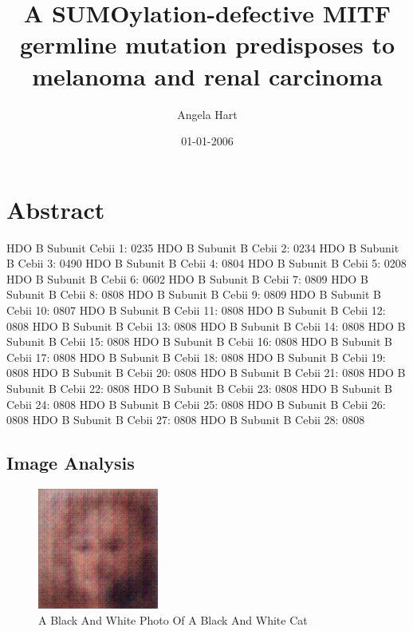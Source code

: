 \documentclass{article}%
\title{A SUMOylation{-}defective MITF germline mutation predisposes to melanoma and renal carcinoma}%
\author{Angela Hart}%
\affil{Department of Cardiology, Zhongda Hospital, Medical School of Southeast University, Nanjing, Jiangsu, China}%
\date{01{-}01{-}2006}%
\begin{document}
%
\normalsize%
\maketitle%
\section{Abstract}%
\label{sec:Abstract}%
HDO B Subunit Cebii 1: 0235\newline%
HDO B Subunit B Cebii 2: 0234\newline%
HDO B Subunit B Cebii 3: 0490\newline%
HDO B Subunit B Cebii 4: 0804\newline%
HDO B Subunit B Cebii 5: 0208\newline%
HDO B Subunit B Cebii 6: 0602\newline%
HDO B Subunit B Cebii 7: 0809\newline%
HDO B Subunit B Cebii 8: 0808\newline%
HDO B Subunit B Cebii 9: 0809\newline%
HDO B Subunit B Cebii 10: 0807\newline%
HDO B Subunit B Cebii 11: 0808\newline%
HDO B Subunit B Cebii 12: 0808\newline%
HDO B Subunit B Cebii 13: 0808\newline%
HDO B Subunit B Cebii 14: 0808\newline%
HDO B Subunit B Cebii 15: 0808\newline%
HDO B Subunit B Cebii 16: 0808\newline%
HDO B Subunit B Cebii 17: 0808\newline%
HDO B Subunit B Cebii 18: 0808\newline%
HDO B Subunit B Cebii 19: 0808\newline%
HDO B Subunit B Cebii 20: 0808\newline%
HDO B Subunit B Cebii 21: 0808\newline%
HDO B Subunit B Cebii 22: 0808\newline%
HDO B Subunit B Cebii 23: 0808\newline%
HDO B Subunit B Cebii 24: 0808\newline%
HDO B Subunit B Cebii 25: 0808\newline%
HDO B Subunit B Cebii 26: 0808\newline%
HDO B Subunit B Cebii 27: 0808\newline%
HDO B Subunit B Cebii 28: 0808

%
\subsection{Image Analysis}%
\label{subsec:ImageAnalysis}%


\begin{figure}[h!]%
\centering%
\includegraphics[width=150px]{500_fake_images/samples_5_346.png}%
\caption{A Black And White Photo Of A Black And White Cat}%
\end{figure}

%
\end{document}
